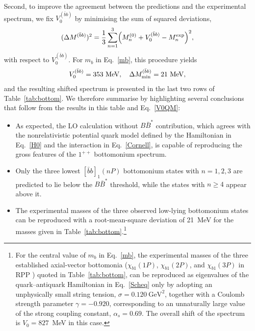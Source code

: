 \documentclass[aps,prd,showpacs,amsmath,twocolumn,superscriptaddress,floatfix,nofootinbib,notitlepage]{revtex4-2}
\newcommand{\bbnP}{[\bar{b}b]_1(nP)}
\newcommand{\be}{\begin{equation}}
\newcommand{\ee}{\end{equation}}
\newcommand{\QQ}{\bar{b}b}
\begin{document}
Second, to improve the agreement between the predictions and the experimental spectrum, we fix $V_0^{(\QQ)}$ by minimising the sum of squared deviations,
\be
(\Delta M^{(\QQ)})^2=\frac13\sum_{n=1}^3\Bigl(M_n^{(0)}+V_0^{(\QQ)}-M_n^{\rm exp}\Bigr)^2,
\ee
with respect to $V_0^{(\QQ)}$. For $m_b$ in Eq.~\eqref{mb}, this procedure yields
\be
V_0^{(\QQ)}= 353~\mbox{MeV},\quad \Delta M^{(\QQ)}_{\rm min}= 21~\mbox{MeV},
\label{V0QM}
\ee
and the resulting shifted spectrum is presented in the last two rows of Table~\ref{tab:bottom}. We therefore summarise by highlighting several conclusions that follow from the results in this table and Eq.~\eqref{V0QM}:
\begin{itemize}[leftmargin=*]
\item As expected,
the LO calculation without $B\bar{B}^*$ contribution, which agrees with 
the nonrelativistic potential quark model defined by the Hamiltonian in Eq.~\eqref{H0} and the interaction in Eq.~\eqref{Cornell}, is capable of reproducing the gross features of the $1^{++}$ bottomonium spectrum.
\item Only the three lowest $\bbnP$ bottomonium states with $n=1,2,3$ are predicted to lie below the $B\bar{B}^*$ threshold, while the states with $n\geqslant 4$ appear above it.
\item The experimental masses of the three observed low-lying bottomonium states can be reproduced with a root-mean-square deviation of 21~MeV for the masses given in Table~\ref{tab:bottom}.\footnote{For the central value of $m_b$ in Eq.~\eqref{mb}, the experimental masses of the three established axial-vector bottomonia ($\chi_{b1}(1P)$, $\chi_{b1}(2P)$, and $\chi_{b1}(3P)$ in RPP \cite{ParticleDataGroup:2026mpi}) quoted in Table~\ref{tab:bottom}, can be reproduced as eigenvalues of the quark--antiquark Hamiltonian in Eq.~\eqref{Scheq} only by adopting an unphysically small string tension, $\sigma=0.120~\mbox{GeV}^{2}$, together with a Coulomb strength parameter $\gamma=-0.920$, corresponding to an unnaturally large value of the strong coupling constant, $\alpha_s=0.69$. The overall shift of the spectrum is $V_0=827$~MeV in this case.}
\end{itemize}
\end{document}
